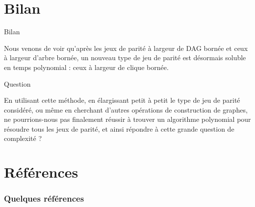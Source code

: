 \documentclass[8pt]{beamer}
\begin{document}
%  
%  

 \section{Bilan}
 \frame{\tableofcontents[current]}

 \begin{frame}

  \begin{block}{Bilan}
   \begin{center}
    Nous venons de voir qu'après les jeux de parité à largeur de DAG
    bornée et ceux à largeur d'arbre bornée, un nouveau type de jeu de
    parité est désormais soluble en temps polynomial : ceux à largeur de
    clique bornée.
   \end{center}
  \end{block}

  \pause
  \begin{block}{Question}
   \begin{center}
    En utilisant cette méthode, en élargissant petit à petit le type de
    jeu de parité considéré, ou même en cherchant d'autres opérations de
    construction de graphes, ne pourrions-nous pas finalement réussir à 
    trouver un algorithme polynomial pour résoudre tous les jeux de 
    parité, et ainsi répondre à cette grande question de complexité ?
   \end{center}
  \end{block}

 \end{frame}

 \section*{Références}
 \begin{frame}[allowframebreaks]
  \frametitle{Quelques références}
%   
%   
 \end{frame}

\end{document}
